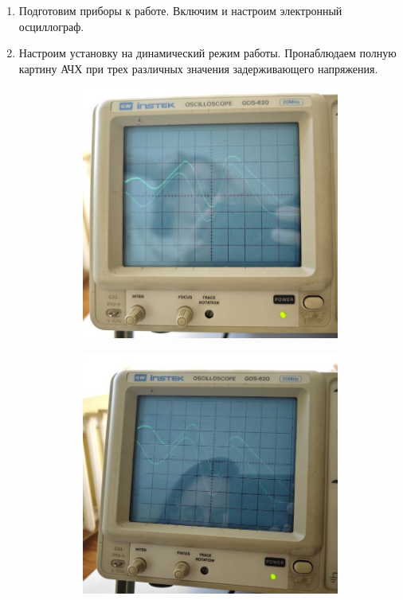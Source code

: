 \documentclass[14pt, a4paper]{report}
\begin{document}
\begin{enumerate}

\item Подготовим приборы к работе. Включим и настроим электронный осциллограф.

\item Настроим установку на динамический режим работы. Пронаблюдаем полную картину АЧХ при трех различных значения задерживающего напряжения.

\begin{figure}[H]
\centering
\begin{subfigure}{.33\textwidth}
  \centering
  \includegraphics[width=.975\linewidth]{../images/521-8a}
\end{subfigure}%
\begin{subfigure}{.33\textwidth}
  \centering
  \includegraphics[width=.975\linewidth]{../images/521-8b}

\end{subfigure}
\end{figure}
\end{enumerate}
\end{document}
